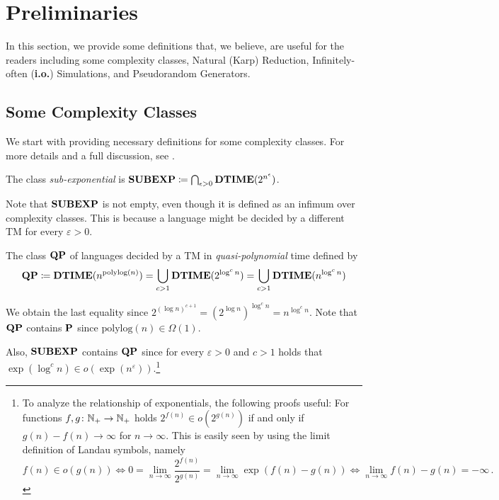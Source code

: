 \documentclass[11pt]{article}
\begin{document}
\section{Preliminaries}

In this section, we provide some definitions that, we believe, are useful for the readers including some complexity classes, Natural (Karp) Reduction, Infinitely-often (\textbf{i.o.}) Simulations, and Pseudorandom Generators.

\subsection{Some Complexity Classes}
We start with providing necessary definitions for some complexity classes.
For more details and a full discussion, see \cite{arora2009}.

\begin{definition}
  The class \emph{sub-exponential} is
  $\class{SUBEXP} \coloneqq \bigcap_{\epsilon > 0} \TIME(2^{n^{\epsilon}})$.
\end{definition}

Note that $\class{SUBEXP}$ is not empty, even though it is defined as an infimum
over complexity classes. This is because a language might be decided by a
different TM for every $\varepsilon > 0$.

\begin{definition}
	The class $\class{QP}$ of languages decided by a TM in
	\emph{quasi-polynomial} time defined by
	\[
	\class{QP}
	\coloneqq
	\TIME(n^{\mathrm{polylog}(n)})
	=
	\bigcup_{c > 1}\TIME(2^{\log^c n})
	=
	\bigcup_{c > 1}\TIME(n^{\log^c n})
	\]
\end{definition}
We obtain the last equality since
$2^{(\log n)^{c+1}} = (2^{\log n})^{\log^c n} = n^{\log^c n}$.
%
Note that $\class{QP}$ contains $\P$ since
$\mathrm{polylog}(n) \in \Omega(1)$.

Also, $\class{SUBEXP}$ contains $\class{QP}$ since for every
$\varepsilon > 0$ and $c > 1$ holds that
$\exp(\log^c n) \in o(\exp(n^\varepsilon))$.\footnote{To analyze the
relationship of exponentials, the following proofs useful:
For functions $f, g \colon \N_+ \to \N_+$ holds
$2^{f(n)} \in o(2^{g(n)})$ if and only if $g(n) - f(n) \to \infty$ for
$n \to \infty$.
This is easily seen by using the limit definition of Landau symbols, namely
\[
  f(n) \in o(g(n))
  \iff
  0 = \lim_{n \to \infty} \frac{2^{f(n)}}{2^{g(n)}}
  = \lim_{n \to \infty} \exp(f(n) - g(n))
  \iff
  \lim_{n \to \infty} f(n) - g(n) = -\infty \,.
\]}
\end{document}
